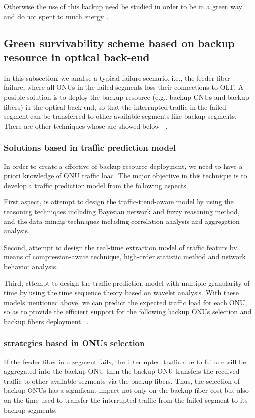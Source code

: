 \documentclass[conference,compsoc]{IEEEtran}
\begin{document}
Otherwise  the use of this backup need be studied in order to be in a green way and do not spent to 
much energy \cite{Liu201268}.
 
\subsection{Green survivability scheme based on backup resource in optical back-end}

In this subsection, we analise a typical failure scenario, i.e., the feeder fiber failure, where all ONUs in the failed segments loss their connections to OLT. 
A posible solution is to deploy the backup resource (e.g., backup ONUs and backup fibers) in the optical back-end, so that the interrupted traffic in the failed segment can be transferred to other available segments like  backup segments. 
There are other techniques whose are showed below ~\cite{Liu201268}.

\subsubsection{Solutions based in traffic prediction model}

In order to create a effective  of backup resource deployment, we need to have a priori knowledge 
of ONU traffic load. 
The major objective in this technique is to develop a traffic prediction model from the following 
aspects. 

First aspect, is attempt to design the traffic-trend-aware model by using the reasoning 
techniques including Bayesian network and fuzzy reasoning method, and the data mining techniques 
including correlation analysis and aggregation analysis.

Second, attempt to design the real-time extraction model of traffic feature by means of 
compression-aware technique, high-order statistic method and network behavior analysis.

Third, attempt to design the traffic prediction model with 
multiple granularity of time by using the time sequence theory based on wavelet analysis. With 
these models mentioned above, we can predict the expected traffic load for each ONU, so as to 
provide the efficient support for the following backup ONUs selection and backup fibers deployment 
~\cite{matrixtraficest}.


\subsubsection{strategies based in ONUs selection}
If the feeder fiber in a segment fails, the interrupted traffic due to failure will be 
aggregated  into the backup ONU then the backup ONU transfers the received traffic to other 
available segments via the backup fibers. 
Thus, the selection of backup ONUs has a significant impact not only on the backup fiber cost but 
also on the time used to transfer the interrupted traffic from the failed segment to its backup 
segments. 
\end{document}
